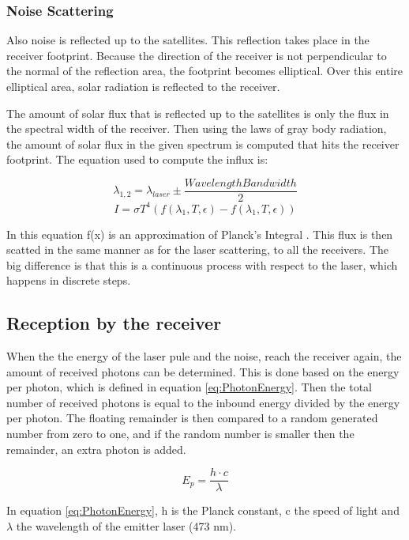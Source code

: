 \subsubsection{Noise Scattering}

Also noise is reflected up to the satellites. This reflection takes place in the receiver footprint. Because the direction of the receiver is not perpendicular to the normal of the reflection area, the footprint becomes elliptical. Over this entire elliptical area, solar radiation is reflected to the receiver.

The amount of solar flux that is reflected up to the satellites is only the flux in the spectral width of the receiver. Then using the laws of gray body radiation, the amount of solar flux in the given spectrum is computed that hits the receiver footprint. The equation used to compute the influx is:

\begin{equation}
	\lambda_{1,2} = \lambda _{laser} \pm \frac{Wavelength Bandwidth}{2}
\end{equation}
\begin{equation}
	I = \sigma T^4 (f(\lambda _1, T, \epsilon) - f(\lambda _1, T, \epsilon))
\end{equation}

In this equation f(x) is an approximation of Planck's Integral \cite[p.~26]{rees}. This flux is then scatted in the same manner as for the laser scattering, to all the receivers. The big difference is that this is a continuous process with respect to the laser, which happens in discrete steps.

\subsection{Reception by the receiver}

When the the energy of the laser pule and the noise, reach the receiver again, the amount of received photons can be determined. This is done based on the energy per photon, which is defined in equation \ref{eq:PhotonEnergy}. Then the total number of received photons is equal to the inbound energy divided by the energy per photon. The floating remainder is then compared to a random generated number from zero to one, and if the random number is smaller then the remainder, an extra photon is added.

\begin{equation}
	E_{p}=\frac{h \cdot c}{\lambda}
	\label{eq:PhotonEnergy}
\end{equation}

In equation \ref{eq:PhotonEnergy}, h is the Planck constant, c the speed of light and $\lambda$ the wavelength of the emitter laser (473 nm).
